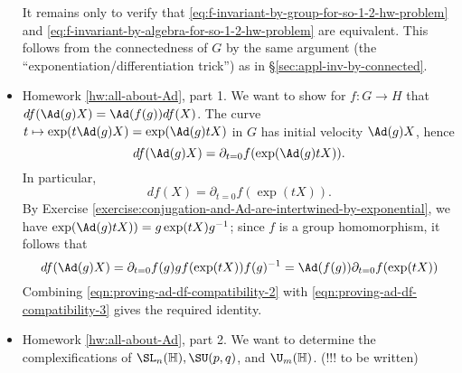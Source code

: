 \documentclass[reqno]{amsart} 
\begin{document}
\begin{itemize}
  It remains only to verify
  that
  \eqref{eq:f-invariant-by-group-for-so-1-2-hw-problem}
  and
  \eqref{eq:f-invariant-by-algebra-for-so-1-2-hw-problem}
  are equivalent.
  This follows from the connectedness of $G$
  by the same argument (the ``exponentiation/differentiation trick'')
  as in \S\ref{sec:appl-inv-by-connected}.
\item Homework \ref{hw:all-about-Ad},
  part 1.
  We want to show for $f : G \rightarrow H$
  that $d f(\Ad(g) X) = \Ad(f(g)) d f(X)$.
  The curve $t \mapsto \exp(t \Ad(g) X) = \exp(\Ad(g) t X)$
  in $G$
  has initial velocity  $\Ad(g) X$,
  hence
  \begin{equation}\label{eqn:proving-ad-df-compatibility-1}
    d f(\Ad(g) X)
    = \partial_{t=0} f(\exp(\Ad(g) t X)).
  \end{equation}
  In particular,
  \begin{equation}\label{eqn:proving-ad-df-compatibility-2}
    d f(X)
    = \partial_{t=0} f(\exp(t X)).
  \end{equation}
  By Exercise
  \ref{exercise:conjugation-and-Ad-are-intertwined-by-exponential},
  we have
  $\exp(\Ad(g) t X))
  = g \exp(t X) g^{-1}$;
  since $f$ is a group homomorphism,
  it follows that
  \begin{equation}\label{eqn:proving-ad-df-compatibility-3}
    d f(\Ad(g) X)
    =
    \partial_{t=0}
    f(g)g
    f(\exp(t X)) f(g)^{-1}
    =
    \Ad(f(g))
    \partial_{t=0}
    f(\exp(t X))
  \end{equation}
  Combining \eqref{eqn:proving-ad-df-compatibility-2}
  with \eqref{eqn:proving-ad-df-compatibility-3}
  gives the required identity.
\item
  Homework \ref{hw:all-about-Ad},
  part 2.
  We want to determine the complexifications
  of
  $\SL_n(\mathbb{H}),
  \SU(p,q)$,
  and $\U_m(\mathbb{H})$.
  (!!! to be written)


\end{itemize}
\end{document}
